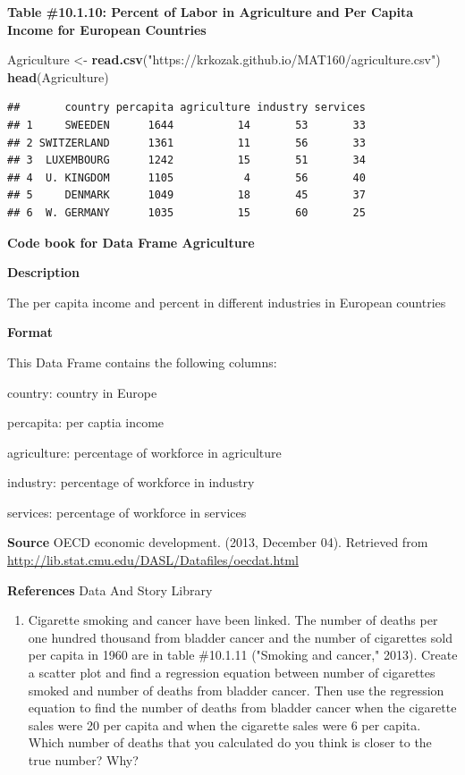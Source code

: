 \documentclass[]{book}
\newenvironment{Shaded}{\begin{snugshade}}{\end{snugshade}}
\newcommand{\KeywordTok}[1]{\textcolor[rgb]{0.13,0.29,0.53}{\textbf{#1}}}
\newcommand{\NormalTok}[1]{#1}
\newcommand{\StringTok}[1]{\textcolor[rgb]{0.31,0.60,0.02}{#1}}
\providecommand{\tightlist}{%
  \setlength{\itemsep}{0pt}\setlength{\parskip}{0pt}}
\begin{document}
\textbf{Table \#10.1.10: Percent of Labor in Agriculture and Per Capita Income for European Countries}

\begin{Shaded}
\begin{Highlighting}[]
\NormalTok{Agriculture <-}\StringTok{ }\KeywordTok{read.csv}\NormalTok{(}\StringTok{"https://krkozak.github.io/MAT160/agriculture.csv"}\NormalTok{)}
\KeywordTok{head}\NormalTok{(Agriculture)}
\end{Highlighting}
\end{Shaded}

\begin{verbatim}
##       country percapita agriculture industry services
## 1     SWEEDEN      1644          14       53       33
## 2 SWITZERLAND      1361          11       56       33
## 3  LUXEMBOURG      1242          15       51       34
## 4  U. KINGDOM      1105           4       56       40
## 5     DENMARK      1049          18       45       37
## 6  W. GERMANY      1035          15       60       25
\end{verbatim}

\textbf{Code book for Data Frame Agriculture}

\textbf{Description}

The per capita income and percent in different industries in European countries

\textbf{Format}

This Data Frame contains the following columns:

country: country in Europe

percapita: per captia income

agriculture: percentage of workforce in agriculture

industry: percentage of workforce in industry

services: percentage of workforce in services

\textbf{Source}
OECD economic development. (2013, December 04). Retrieved from
\url{http://lib.stat.cmu.edu/DASL/Datafiles/oecdat.html}

\textbf{References}
Data And Story Library

\begin{enumerate}
\def\labelenumi{\arabic{enumi}.}
\setcounter{enumi}{8}
\tightlist
\item
  Cigarette smoking and cancer have been linked. The number of deaths per one hundred thousand from bladder cancer and the number of cigarettes sold per capita in 1960 are in table \#10.1.11 ("Smoking and cancer," 2013). Create a scatter plot and find a regression equation between number of cigarettes smoked and number of deaths from bladder cancer. Then use the regression equation to find the number of deaths from bladder cancer when the cigarette sales were 20 per capita and when the cigarette sales were 6 per capita. Which number of deaths that you calculated do you think is closer to the true number? Why?
\end{enumerate}
\end{document}
